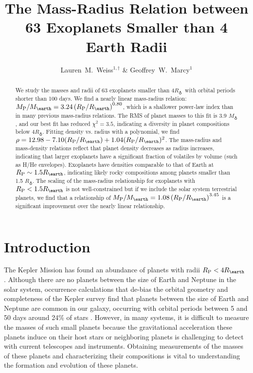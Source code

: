 \documentclass[iop]{emulateapj}
\newcommand{\rpl}{\ensuremath{R_{\rm P}}}
\newcommand{\mpl}{\ensuremath{M_{\rm P}}}
\newcommand{\rearth}{\ensuremath{R_\earth}}
\newcommand{\mearth}{\ensuremath{M_\earth}}
\begin{document}
\title{The Mass-Radius Relation between 63 Exoplanets Smaller than 4 Earth Radii}
\author{Lauren~M.~Weiss$^{1,\dagger}$ \& Geoffrey~W.~Marcy$^1$}


\begin{abstract}
We study the masses and radii of 63 exoplanets smaller than 4\rearth\ with orbital periods shorter than 100 days.  We find a nearly linear mass-radius relation: $\mpl/\mearth = 3.24 \left(\rpl/\rearth\right)^{0.80}$, which is a shallower power-law index than in many previous mass-radius relations.  The RMS of planet masses to this fit is 3.9 \mearth, and our best fit has reduced $\chi^2=3.5$, indicating a diversity in planet compositions below 4\rearth.  Fitting density vs. radius with a polynomial, we find $\rho = 12.98 -7.10(\rpl/\rearth) + 1.04(\rpl/\rearth)^2$.  The mass-radius and mass-density relations reflect that planet density decreases as radius increases, indicating that larger exoplanets have a significant fraction of volatiles by volume (such as H/He envelopes).  Exoplanets have densities comparable to that of Earth at  $\rpl \sim1.5\rearth$, indicating likely rocky compositions among planets smaller than 1.5 \rearth. The scaling of the mass-radius relationship for exoplanets with $\rpl < 1.5 \rearth$ is not well-constrained but if we include the solar system terrestrial planets, we find that a relationship of $\mpl/\mearth = 1.08 \left(\rpl/\rearth\right)^{3.45}$ is a significant improvement over the nearly linear relationship.
\end{abstract}


\section{Introduction}

The Kepler Mission has found an abundance of planets with radii $\rpl < 4\rearth$ \citep{Batalha2013}.  Although there are no planets between the size of Earth and Neptune in the solar system, occurrence calculations that de-bias the orbital geometry and completeness of the Kepler survey find that planets between the size of Earth and Neptune are common in our galaxy, occurring with orbital periods between 5 and 50 days around 24\% of stars \citep{Petigura2013a}.  However, in many systems, it is difficult to measure the masses of such small planets because the gravitational acceleration these planets induce on their host stars or neighboring planets is challenging to detect with current telescopes and instruments.  Obtaining measurements of the masses of these planets and characterizing their compositions is vital to understanding the formation and evolution of these planets.
\end{document}
